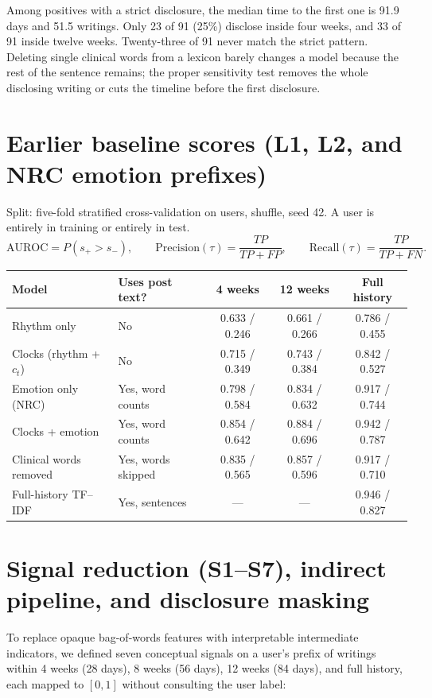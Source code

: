 \documentclass[11pt,a4paper]{article}
\begin{document}
Among positives with a strict disclosure, the median time to the first one is 91.9 days and 51.5 writings. Only 23 of 91 (25\%) disclose inside four weeks, and 33 of 91 inside twelve weeks. Twenty-three of 91 never match the strict pattern. Deleting single clinical words from a lexicon barely changes a model because the rest of the sentence remains; the proper sensitivity test removes the whole disclosing writing or cuts the timeline before the first disclosure.

\section{Earlier baseline scores (L1, L2, and NRC emotion prefixes)}
Split: five-fold stratified cross-validation on users, shuffle, seed 42. A user is entirely in training or entirely in test.
\begin{equation}
\mathrm{AUROC} = P(s_+ > s_-), \qquad
\mathrm{Precision}(\tau) = \frac{TP}{TP + FP}, \qquad
\mathrm{Recall}(\tau) = \frac{TP}{TP + FN}.
\end{equation}

\begin{center}
\begin{tabular}{llccc}
\toprule
\textbf{Model} & \textbf{Uses post text?} & \textbf{4 weeks} & \textbf{12 weeks} & \textbf{Full history} \\
\midrule
Rhythm only & No & 0.633 / 0.246 & 0.661 / 0.266 & 0.786 / 0.455 \\
Clocks (rhythm + $c_t$) & No & 0.715 / 0.349 & 0.743 / 0.384 & 0.842 / 0.527 \\
Emotion only (NRC) & Yes, word counts & 0.798 / 0.584 & 0.834 / 0.632 & 0.917 / 0.744 \\
Clocks + emotion & Yes, word counts & 0.854 / 0.642 & 0.884 / 0.696 & 0.942 / 0.787 \\
Clinical words removed & Yes, words skipped & 0.835 / 0.565 & 0.857 / 0.596 & 0.917 / 0.710 \\
Full-history TF--IDF & Yes, sentences & --- & --- & 0.946 / 0.827 \\
\bottomrule
\end{tabular}
\end{center}

\section{Signal reduction (S1--S7), indirect pipeline, and disclosure masking}
To replace opaque bag-of-words features with interpretable intermediate indicators, we defined seven conceptual signals on a user's prefix of writings within 4 weeks (28 days), 8 weeks (56 days), 12 weeks (84 days), and full history, each mapped to $[0,1]$ without consulting the user label:
\end{document}
